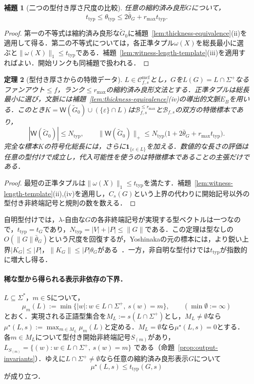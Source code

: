 \documentclass[11pt,a4paper]{ltjsarticle}
\numberwithin{equation}{section}
\theoremstyle{plain}
\newtheorem{theorem}{定理}[section]
\newtheorem{lemma}[theorem]{補題}
\theoremstyle{definition}
\theoremstyle{remark}
\newcommand{\Wit}{\mathsf{W}}
\newcommand{\Cmcf}[2]{\mathcal{C}^{\mathrm{mcf}}_{#1,#2}}
\newcommand{\eps}{\varepsilon}
\begin{document}
\begin{lemma}[二つの型付き厚さ尺度の比較]
\label{lem:typed-thickness-equivalence}
任意の縮約済み良形$G$について，
\[
 t_{\mathrm{typ}}\le\theta_{\mathrm{typ}}
 \le2\bar\theta_G+r_{\max}t_{\mathrm{typ}}.
\]
\end{lemma}
\begin{proof}
第一の不等式は縮約済み良形な$\widetilde G_0$に補題~\ref{lem:thickness-equivalence}(ii)を適用して得る．第二の不等式については，各正準タプル$\omega(X)$を総長最小に選ぶと$\|\omega(X)\|_1\le t_{\mathrm{typ}}$である．補題~\ref{lem:witness-length-template}(iii)を適用すればよい．開始リンクも同補題で扱われる．
\end{proof}

\begin{theorem}[型付き厚さからの特徴データ]
\label{thm:data-from-typed-thickness}
$L\in\Cmcf{f}{s}$とし，$G$を$L(G)=L\cap\Sigma^+$なるファンアウト$\le f$，ランク$\le r_{\max}$の縮約済み良形文法とする．正準タプルは総長最小に選び，文脈には補題~\ref{lem:thickness-equivalence}(iv)の導出的文脈$E_B$を用いる．このとき$K=\Wit(\widetilde G_0)\cup(\{\eps\}\cap L)$は$\mathcal B^{\le r_{\max}}_{f,s}$と$\mathcal B_{f,s}$の双方の特徴標本であり，
\[
 |\Wit(\widetilde G_0)|\le N_{\mathrm{typ}},\qquad
 \|\Wit(\widetilde G_0)\|_+\le
 N_{\mathrm{typ}}\bigl(1+2\bar\theta_G+r_{\max}t_{\mathrm{typ}}\bigr).
\]
完全な標本$K$の符号化総長には，さらに$\mathbf 1_{\{\eps\in L\}}$を加える．数値的な長さの評価は任意の型付けで成立し，代入可能性を使うのは特徴標本であることの主張だけである．
\end{theorem}
\begin{proof}
最短の正準タプルは$\|\omega(X)\|_1\le t_{\mathrm{typ}}$を満たす．補題~\ref{lem:witness-length-template}(ii),(iv)を適用し，$C_s(G)$という上界の代わりに開始記号以外の型付き非終端記号と規則の数を数える．
\end{proof}

自明型付けでは，$\lambda$-自由な$G$の各非終端記号が実現する型ベクトルは一つなので，$t_{\mathrm{typ}}=t_G$であり，$N_{\mathrm{typ}}=|V|+|P|\le\|G\|$である．この定理は型なしの$O(\|G\|\bar\theta_G)$という尺度を回復するが，Yoshinakaの元の標本には，より鋭い上界$|K_G|\le|P|$，$\|K_G\|\le|P|\theta_G$がある~\cite[Lemma~7 and Theorem~1]{Yoshinaka2011}．一方，非自明な型付けでは$t_{\mathrm{typ}}$が指数的に増大し得る．

\paragraph{稀な型から得られる表示非依存の下界．}
$L\subseteq\Sigma^*$，$m\in\mathsf S$について，
\[
 \mu_m(L):=\min\{|w|:w\in L\cap\Sigma^+,\ s(w)=m\},
 \qquad(\min\emptyset:=\infty)
\]
とおく．実現される正語型集合を$M_L:=s(L\cap\Sigma^+)$とし，$M_L\ne\emptyset$なら
$\mu^\star(L,s):=\max_{m\in M_L}\mu_m(L)$と定める．$M_L=\emptyset$なら$\mu^\star(L,s)=0$とする．各$m\in M_L$について型付き開始非終端記号$S_{(m)}$があり，
$L_{S_{(m)}}=\{(w):w\in L\cap\Sigma^+,\ s(w)=m\}$
である（命題~\ref{prop:output-invariants}）．ゆえに$L\cap\Sigma^+\ne\emptyset$なら任意の縮約済み良形表示$G$について
\begin{equation}\label{eq:root-thickness}
 \mu^\star(L,s)\le t_{\mathrm{typ}}(G,s)
\end{equation}
が成り立つ．
\end{document}
